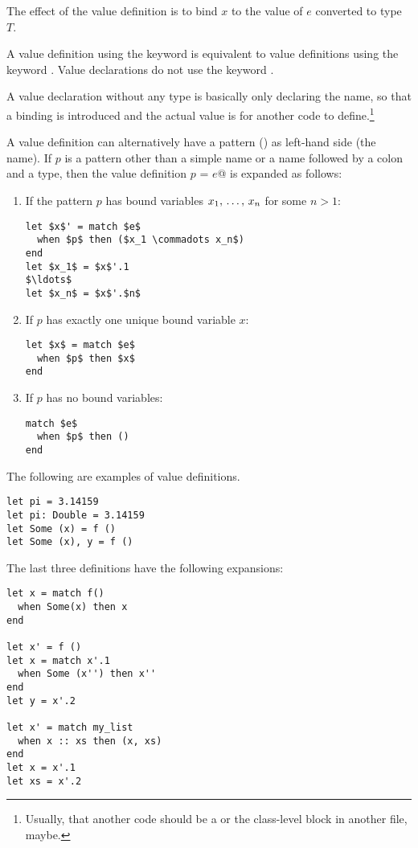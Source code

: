 The effect of the value definition is to bind $x$ to the value of $e$ converted to type $T$. 

A value definition using the keyword  is equivalent to value definitions using the keyword . Value declarations do not use the keyword . 

A value declaration without any type is basically only declaring the name, so that a binding is introduced and the actual value is for another code to define.\footnote{Usually, that another code should be a  or the class-level block in another file, maybe.}

A value definition can alternatively have a pattern () as left-hand side (the name). If $p$ is a pattern other than a simple name or a name followed by a colon and a type, then the value definition \lstinline@val $p$ = $e$@ is expanded as follows: 

\begin{enumerate}
\item
If the pattern $p$ has bound variables $x_1 ,\, \ldots ,\, x_n$ for some $n > 1$:
\begin{lstlisting}[escapechar=@]
let $x$' = match $e$
  when $p$ then ($x_1 \commadots x_n$)
end
let $x_1$ = $x$'.1
$\ldots$
let $x_n$ = $x$'.$n$
\end{lstlisting}

\item
If $p$ has exactly one unique bound variable $x$:
\begin{lstlisting}
let $x$ = match $e$
  when $p$ then $x$
end
\end{lstlisting}

\item
If $p$ has no bound variables:
\begin{lstlisting}
match $e$
  when $p$ then ()
end
\end{lstlisting}
\end{enumerate}

\example The following are examples of value definitions. 
\begin{lstlisting}
let pi = 3.14159
let pi: Double = 3.14159
let Some (x) = f () 
let Some (x), y = f ()
\end{lstlisting}

The last three definitions have the following expansions:
\begin{lstlisting}[escapechar=@]
let x = match f()
  when Some(x) then x
end

let x' = f ()
let x = match x'.1
  when Some (x'') then x''
end
let y = x'.2

let x' = match my_list
  when x :: xs then (x, xs)
end
let x = x'.1
let xs = x'.2
\end{lstlisting}

